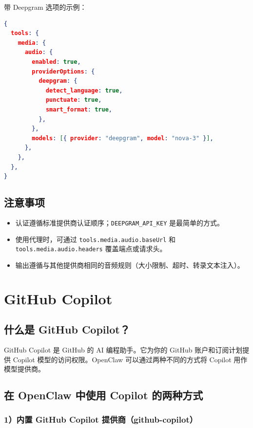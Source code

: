 带 Deepgram 选项的示例：

\begin{lstlisting}[language=json]
{
  tools: {
    media: {
      audio: {
        enabled: true,
        providerOptions: {
          deepgram: {
            detect_language: true,
            punctuate: true,
            smart_format: true,
          },
        },
        models: [{ provider: "deepgram", model: "nova-3" }],
      },
    },
  },
}
\end{lstlisting}


\subsection{注意事项}


\begin{itemize}
  \item 认证遵循标准提供商认证顺序；\texttt{DEEPGRAM\_API\_KEY} 是最简单的方式。
  \item 使用代理时，可通过 \texttt{tools.media.audio.baseUrl} 和 \texttt{tools.media.audio.headers} 覆盖端点或请求头。
  \item 输出遵循与其他提供商相同的音频规则（大小限制、超时、转录文本注入）。
\end{itemize}



\clearpage

\section{GitHub Copilot}


\subsection{什么是 GitHub Copilot？}


GitHub Copilot 是 GitHub 的 AI 编程助手。它为你的 GitHub 账户和订阅计划提供 Copilot 模型的访问权限。OpenClaw 可以通过两种不同的方式将 Copilot 用作模型提供商。

\subsection{在 OpenClaw 中使用 Copilot 的两种方式}


\subsubsection{1）内置 GitHub Copilot 提供商（github-copilot）}


